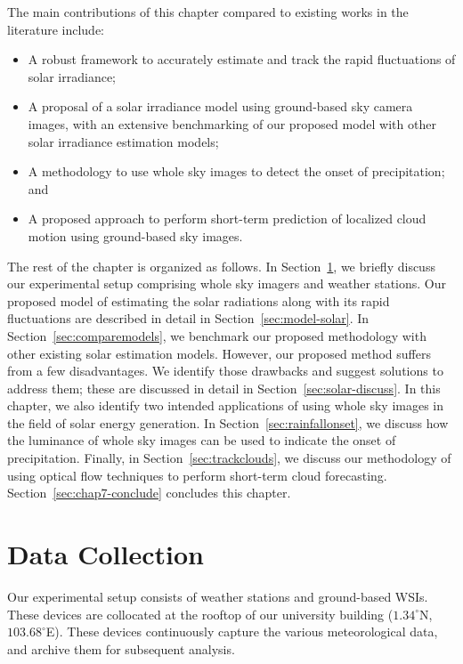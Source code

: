 The main contributions of this chapter compared to existing works in the literature include:

\begin{itemize}
\item A robust framework to accurately estimate and track the rapid fluctuations of solar irradiance; 
\item A proposal of a solar irradiance model using ground-based sky camera images, with an extensive benchmarking of our proposed model with other solar irradiance estimation models;
\item A methodology to use whole sky images to detect the onset of precipitation; and
\item A proposed approach to perform short-term prediction of localized cloud motion using ground-based sky images.
\end{itemize}

The rest of the chapter is organized as follows. In Section~\ref{sec:data}, we briefly discuss our experimental setup comprising whole sky imagers and weather stations. Our proposed model of estimating the solar radiations along with its rapid fluctuations are described in detail in Section~\ref{sec:model-solar}. In Section~\ref{sec:comparemodels}, we benchmark our proposed methodology with other existing solar estimation models. However, our proposed method suffers from a few disadvantages. We identify those drawbacks and suggest solutions to address them; these are discussed in detail in Section~\ref{sec:solar-discuss}. In this chapter, we also identify two intended applications of using whole sky images in the field of solar energy generation. In Section~\ref{sec:rainfallonset}, we discuss how the luminance of whole sky images can be used to indicate the onset of precipitation. Finally, in Section~\ref{sec:trackclouds}, we discuss our methodology of using optical flow techniques to perform short-term cloud forecasting. Section~\ref{sec:chap7-conclude} concludes this chapter. 

\section{Data Collection}
\label{sec:data}
Our experimental setup consists of weather stations and ground-based WSIs. These devices are collocated at the rooftop of our university building ($1.34^{\circ}$N, $103.68^{\circ}$E). These devices continuously capture the various meteorological data, and archive them for subsequent analysis. 

